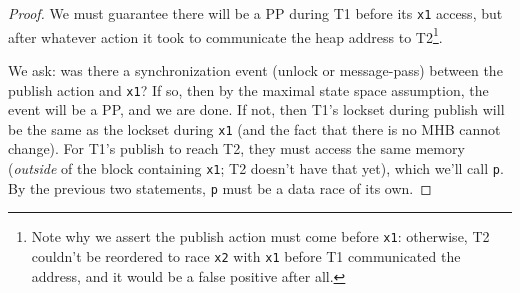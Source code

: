 \documentclass[pldi]{sigplanconf-pldi15}
\begin{document}
\begin{proof}
We must guarantee there will be a PP during T1 before its {\tt x1} access, but after whatever action it took to communicate the heap address to T2\footnote{
Note why we assert the publish action must come before {\tt x1}: otherwise, T2 couldn't be reordered to race {\tt x2} with {\tt x1} before T1 communicated the address, and it would be a false positive after all.}.


We ask: was there a synchronization event (unlock or message-pass) between the publish action and {\tt x1}?
If so, then by the maximal state space assumption, the event will be a PP, and we are done.
If not, then  T1's lockset during publish will be the same as the lockset during {\tt x1} (and the fact that there is no MHB cannot change).
For T1's publish to reach T2, they must access the same memory ({\em outside} of the block containing {\tt x1}; T2 doesn't have that yet),
which we'll call {\tt p}.
By the previous two statements, {\tt p} must be a data race of its own.


\end{proof}
\end{document}
